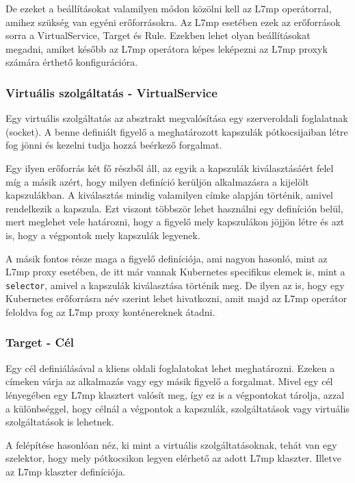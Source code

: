 De ezeket a beállításokat valamilyen módon közölni kell az L7mp operátorral, amihez 
szükség van egyéni erőforrásokra. Az L7mp esetében ezek az erőforrások sorra a 
VirtualService, Target és Rule. Ezekben lehet olyan beállításokat megadni, amiket
később az L7mp operátora képes leképezni az L7mp proxyk számára érthető konfigurációra.

\subsubsection{Virtuális szolgáltatás - VirtualService}

Egy virtuális szolgáltatás az absztrakt megvalósítása egy szerveroldali foglalatnak 
(socket). A benne definiált figyelő a meghatározott kapszulák pótkocsijaiban létre fog 
jönni és kezelni tudja hozzá beérkező forgalmat. 

Egy ilyen erőforrás két fő részből áll, az egyik a kapszulák kiválasztásáért felel míg
a másik azért, hogy milyen definíció kerüljön alkalmazásra a kijelölt kapszulákban.
A kiválasztás mindig valamilyen címke alapján történik, amivel rendelkezik a kapszula. 
Ezt viszont többször lehet használni egy definíción belül, mert meglehet vele határozni,
hogy a figyelő mely kapszulákon jöjjön létre és azt is, hogy a végpontok mely kapszulák 
legyenek. 

A másik fontos része maga a figyelő definíciója, ami nagyon hasonló, mint az L7mp proxy
esetében, de itt már vannak Kubernetes specifikus elemek is, mint a \texttt{selector},
amivel a kapszulák kiválasztása történik meg. De ilyen az is, hogy egy Kubernetes 
erőforrásra név szerint lehet hivatkozni, amit majd az L7mp operátor feloldva fog az L7mp
proxy konténereknek átadni.

\subsubsection{Target - Cél}

Egy cél definiálásával a kliens oldali foglalatokat lehet meghatározni. Ezeken 
a címeken várja az alkalmazás vagy egy másik figyelő a forgalmat. Mivel egy cél 
lényegében egy L7mp klasztert valósít meg, így ez is a végpontokat tárolja, azzal a 
különbséggel, hogy célnál a végpontok a kapszulák, szolgáltatások vagy virtuális 
szolgáltatások is lehetnek. 

A felépítése hasonlóan néz, ki mint a virtuális szolgáltatásoknak, tehát van egy 
szelektor, hogy mely pótkocsikon legyen elérhető az adott L7mp klaszter. Illetve az L7mp 
klaszter definíciója. 

